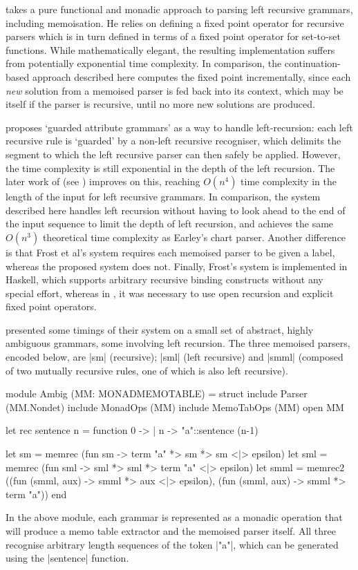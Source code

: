 \citet{Lickman1995} takes a pure functional and monadic approach to parsing left recursive
grammars, including memoisation. He relies on defining a fixed point operator for recursive
parsers which is in turn defined in terms of a fixed point operator for set-to-set functions. While
mathematically elegant, the resulting implementation suffers from potentially exponential time 
complexity. In comparison, the continuation-based approach
described here computes the fixed point incrementally, since each \emph{new} 
solution from a memoised parser is fed back into its context, which may be itself if the parser is
recursive, until no more new solutions are produced.

\citet{Frost1993} proposes `guarded attribute grammars' as a way to handle
left-recursion: each left recursive rule is `guarded' by a non-left recursive recogniser,
which delimits the segment to which the left recursive parser can then safely be applied.
However, the time complexity is still exponential in the depth of the 
left recursion.
The later work of \citet{FrostHafiz2006} (see ) improves on this, reaching $O(n^4)$
time complexity in the length of the input for left recursive grammars. In comparison, the system 
described here handles left recursion without having to look ahead to the end of the input sequence 
to limit the depth of left recursion, and achieves the same $O(n^3)$ theoretical time complexity 
as Earley's chart parser. 
Another difference is that Frost et al's system
requires each memoised parser to be given a label, whereas the proposed system does not. Finally,
Frost's system is implemented in Haskell, which supports
arbitrary recursive binding constructs without any special effort, whereas in \OCaml, it was
necessary to use open recursion and explicit fixed point operators.

\citet{FrostHafizCallaghan2007} presented
some timings of their system on a small set of abstract, highly ambiguous grammars,
some involving left recursion.
The three memoised parsers, encoded below, are |sm| (recursive); |sml| (left recursive) and |smml| (composed of
two mutually recursive rules, one of which is also left recursive).
\begin{ocaml}
	module Ambig (MM: MONADMEMOTABLE) = struct
		include Parser (MM.Nondet)
		include MonadOps (MM)
		include MemoTabOps (MM)
		open MM

		let rec sentence n = function 0 -> {} | n -> "a"::sentence (n-1)

		let sm = memrec (fun sm -> term "a" *> sm *> sm <|> epsilon)
		let sml = memrec (fun sml -> sml *> sml *> term "a" <|> epsilon)
		let smml = memrec2 ((fun (smml, aux) -> smml *> aux <|> epsilon),
													 (fun (smml, aux) -> smml *> term "a"))
	end
\end{ocaml}
In the above module, each grammar is represented as a monadic operation that will
produce a memo table extractor and the memoised parser itself. All three recognise arbitrary length sequences of the
token |"a"|, which can be generated using the |sentence| function.


